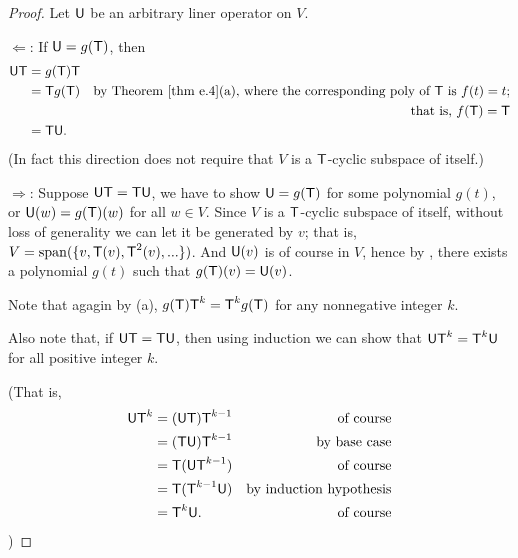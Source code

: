 \begin{proof}
Let \(\textsf{U}\) be an arbitrary liner operator on \(V\).

\(\Longleftarrow\):
If \(\textsf{U} = g(\textsf{T})\), then
\begin{align*}
    \U \T & = g(\T) \T \\
          & = \T g(\T) & \text{by \THM{e.4}(a), where the corresponding poly of \(\T\) is \(f(t) = t\);} \\
          &            & \text{that is, \(f(\T) = \T\)} \\
          & = \T \U.
\end{align*}
(In fact this direction does not require that \(V\) is a \(\textsf{T}\)-cyclic subspace of itself.)

\(\Longrightarrow\):
Suppose \(\textsf{U}\textsf{T} = \textsf{T}\textsf{U}\), we have to show \(\textsf{U} = g(\textsf{T})\) for some polynomial \(g(t)\), or \(\textsf{U}(w) = g(\textsf{T})(w)\) for all \(w \in V\).
Since \(V\) is a \(\textsf{T}\)-cyclic subspace of itself, without loss of generality we can let it be generated by \(v\);
that is, \(V = \operatorname{span}(\{ v, \textsf{T}(v), \textsf{T}^2(v), ... \})\).  \quad \quad
And \(\textsf{U}(v)\) is of course in \(V\), hence by , there exists a polynomial \(g(t)\) such that \(g(\textsf{T})(v) = \textsf{U}(v)\). 

Note that agagin by (a), \(g(\textsf{T}) \textsf{T}^k = \textsf{T}^k g(\textsf{T})\) for any nonnegative integer \(k\). 

Also note that, if \(\textsf{U}\textsf{T} = \textsf{T}\textsf{U}\), then using induction we can show that \(\textsf{U}\textsf{T}^k = \textsf{T}^k\textsf{U}\) for all positive integer \(k\). 

(That is,
\begin{align*}
    \textsf{U}\textsf{T}^k & = (\textsf{U} \textsf{T}) \textsf{T}^{k - 1} & \text{of course} \\
           & = (\textsf{T} \textsf{U}) \textsf{T}^{k - 1} & \text{by base case} \\
           & = \textsf{T} (\textsf{U} \textsf{T}^{k - 1}) & \text{of course} \\
           & = \textsf{T} (\textsf{T}^{k - 1} \textsf{U}) & \text{by induction hypothesis} \\
           & = \textsf{T}^k \textsf{U}.           & \text{of course}
\end{align*})


\end{proof}
